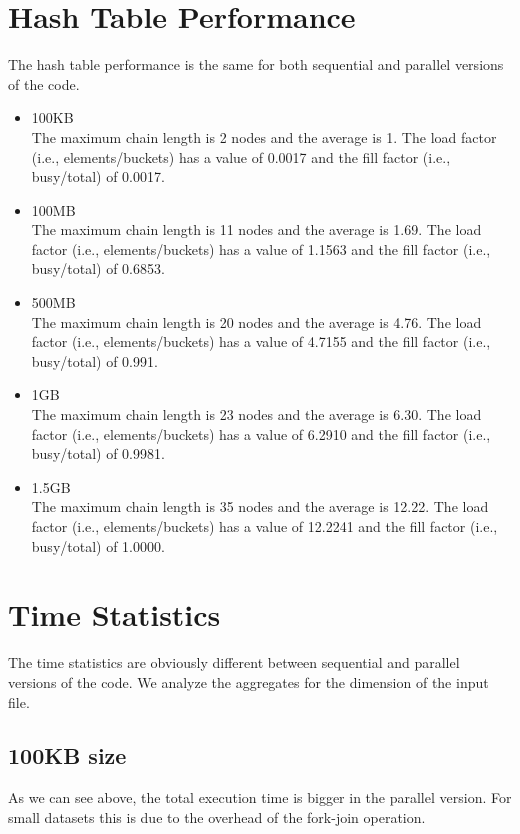 \section{Hash Table Performance}
The hash table performance is the same for both sequential and parallel versions of the code.
\begin{itemize}
    \item 100KB \\
        The maximum chain length is 2 nodes and the average is 1. The load factor (i.e., elements/buckets) has a value of 0.0017 and the fill factor (i.e., busy/total) of 0.0017.
    \item 100MB \\
        The maximum chain length is 11 nodes and the average is 1.69. The load factor (i.e., elements/buckets) has a value of 1.1563 and the fill factor (i.e., busy/total) of 0.6853.
    \item 500MB \\
        The maximum chain length is 20 nodes and the average is 4.76. The load factor (i.e., elements/buckets) has a value of 4.7155 and the fill factor (i.e., busy/total) of 0.991.
    \item 1GB \\
        The maximum chain length is 23 nodes and the average is 6.30. The load factor (i.e., elements/buckets) has a value of 6.2910 and the fill factor (i.e., busy/total) of 0.9981.
    \item 1.5GB \\
        The maximum chain length is 35 nodes and the average is 12.22. The load factor (i.e., elements/buckets) has a value of 12.2241 and the fill factor (i.e., busy/total) of 1.0000.
\end{itemize}

\section{Time Statistics}
The time statistics are obviously different between sequential and parallel versions of the code. We analyze the aggregates for the dimension of the input file.

\subsection{100KB size}
As we can see above, the total execution time is bigger in the parallel version. For small datasets this is due to the overhead of the fork-join operation.

